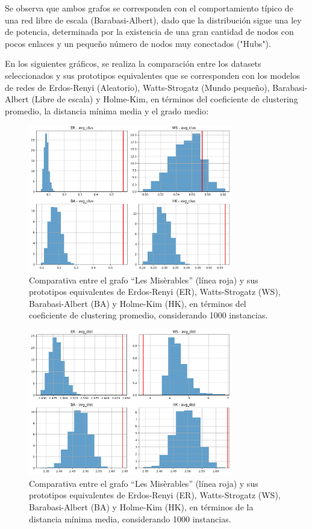 \documentclass[conference]{IEEEtran}
\begin{document}
Se observa que ambos grafos se corresponden con el comportamiento típico de una red libre de escala (Barabasi-Albert), dado que la distribución sigue una ley de potencia, determinada por la existencia de una gran cantidad de nodos con pocos enlaces y un pequeño número de nodos muy conectados ("Hubs").

\vspace{10pt}

En los siguientes gráficos, se realiza la comparación entre los datasets seleccionados y sus prototipos equivalentes que se corresponden con los modelos de redes de Erdos-Renyi (Aleatorio), Watts-Strogatz (Mundo pequeño), Barabasi-Albert (Libre de escala) y Holme-Kim, en términos del coeficiente de clustering promedio, la distancia mínima media y el grado medio:

\begin{figure}[h]
    \centering
    \includegraphics[width=3.5in]{img/comp-prototipos_nm_lesmis-avg_clus.png}
    \captionsetup{width=0.85\linewidth, font=small}
    \caption{Comparativa entre el grafo “Les Misèrables” (línea roja) y sus prototipos equivalentes de Erdos-Renyi (ER), Watts-Strogatz (WS), Barabasi-Albert (BA) y Holme-Kim (HK), en términos del coeficiente de clustering promedio, considerando 1000 instancias.}
    \label{fig:lesmis-avg_clus}
\end{figure}

\begin{figure}[h]
    \centering
    \includegraphics[width=3.5in]{img/comp-prototipos_nm_lesmis-avg_distance.png}
    \captionsetup{width=0.85\linewidth, font=small}
    \caption{Comparativa entre el grafo “Les Misèrables” (línea roja) y sus prototipos equivalentes de Erdos-Renyi (ER), Watts-Strogatz (WS), Barabasi-Albert (BA) y Holme-Kim (HK), en términos de la distancia mínima media, considerando 1000 instancias.}
    \label{fig:lesmis-avg_distance}
\end{figure}
\end{document}
